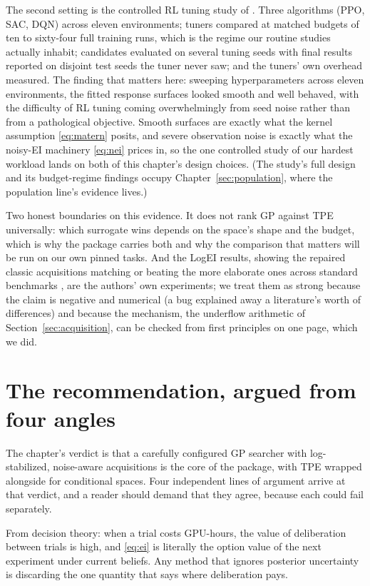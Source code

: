 The second setting is the controlled RL tuning study of
\citet{eimer2023hyperparameters}. Three algorithms (PPO, SAC, DQN)
across eleven environments; tuners compared at matched budgets of ten
to sixty-four full training runs, which is the regime our routine
studies actually inhabit; candidates evaluated on several tuning seeds
with final results reported on disjoint test seeds the tuner never
saw; and the tuners' own overhead measured. The finding that matters
here: sweeping hyperparameters across eleven environments, the fitted
response surfaces looked smooth and well behaved, with the difficulty
of RL tuning coming overwhelmingly from seed noise rather than from a
pathological objective. Smooth surfaces are exactly what the kernel
assumption \eqref{eq:matern} posits, and severe observation noise is
exactly what the noisy-EI machinery \eqref{eq:nei} prices in, so the
one controlled study of our hardest workload lands on both of this
chapter's design choices. (The study's full design and its
budget-regime findings occupy Chapter~\ref{sec:population}, where the
population line's evidence lives.)

Two honest boundaries on this evidence. It does not rank GP against
TPE universally: which surrogate wins depends on the space's shape and
the budget, which is why the package carries both and why the
comparison that matters will be run on our own pinned tasks. And the
LogEI results, showing the repaired classic acquisitions matching or
beating the more elaborate ones across standard benchmarks
\citep{ament2023logei}, are the authors' own experiments; we treat
them as strong because the claim is negative and numerical (a bug
explained away a literature's worth of differences) and because the
mechanism, the underflow arithmetic of
Section~\ref{sec:acquisition}, can be checked from first principles
on one page, which we did.

\section{The recommendation, argued from four angles}
\label{sec:bo-angles}

The chapter's verdict is that a carefully configured GP searcher with
log-stabilized, noise-aware acquisitions is the core of the package,
with TPE wrapped alongside for conditional spaces. Four independent
lines of argument arrive at that verdict, and a reader should demand
that they agree, because each could fail separately.

From decision theory: when a trial costs GPU-hours, the value of
deliberation between trials is high, and \eqref{eq:ei} is literally
the option value of the next experiment under current beliefs. Any
method that ignores posterior uncertainty is discarding the one
quantity that says where deliberation pays.

